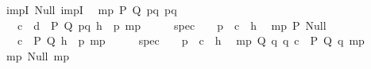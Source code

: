 \begin{isabellebody}
\isanewline
\ \ impI{\isacharcolon}{\kern0pt}\ {\isachardoublequoteopen}Null{\isachardoublequoteclose}\ {\isachardoublequoteopen}impI{\isachardoublequoteclose}\isanewline
\isanewline
\ \ mp\ {\isacharparenleft}{\kern0pt}P{\isacharcomma}{\kern0pt}\ Q{\isacharparenright}{\kern0pt}{\isacharcolon}{\kern0pt}\ {\isachardoublequoteopen}{\isasymlambda}pq{\isachardot}{\kern0pt}\ pq{\isachardoublequoteclose}\isanewline
\ \ \ \ {\isachardoublequoteopen}\isactrlbold {\isasymlambda}{\isacharparenleft}{\kern0pt}c{\isacharcolon}{\kern0pt}\ {\isacharunderscore}{\kern0pt}{\isacharparenright}{\kern0pt}\ {\isacharparenleft}{\kern0pt}d{\isacharcolon}{\kern0pt}\ {\isacharunderscore}{\kern0pt}{\isacharparenright}{\kern0pt}\ P\ Q\ pq\ {\isacharparenleft}{\kern0pt}h{\isacharcolon}{\kern0pt}\ {\isacharunderscore}{\kern0pt}{\isacharparenright}{\kern0pt}\ p{\isachardot}{\kern0pt}\ mp\ {\isasymcdot}\ {\isacharunderscore}{\kern0pt}\ {\isasymcdot}\ {\isacharunderscore}{\kern0pt}\ {\isasymbullet}\ {\isacharparenleft}{\kern0pt}spec\ {\isasymcdot}\ {\isacharunderscore}{\kern0pt}\ {\isasymcdot}\ p\ {\isasymbullet}\ c\ {\isasymbullet}\ h{\isacharparenright}{\kern0pt}{\isachardoublequoteclose}\isanewline
\isanewline
\ \ mp\ {\isacharparenleft}{\kern0pt}P{\isacharparenright}{\kern0pt}{\isacharcolon}{\kern0pt}\ {\isachardoublequoteopen}Null{\isachardoublequoteclose}\isanewline
\ \ \ \ {\isachardoublequoteopen}\isactrlbold {\isasymlambda}{\isacharparenleft}{\kern0pt}c{\isacharcolon}{\kern0pt}\ {\isacharunderscore}{\kern0pt}{\isacharparenright}{\kern0pt}\ P\ Q\ {\isacharparenleft}{\kern0pt}h{\isacharcolon}{\kern0pt}\ {\isacharunderscore}{\kern0pt}{\isacharparenright}{\kern0pt}\ p{\isachardot}{\kern0pt}\ mp\ {\isasymcdot}\ {\isacharunderscore}{\kern0pt}\ {\isasymcdot}\ {\isacharunderscore}{\kern0pt}\ {\isasymbullet}\ {\isacharparenleft}{\kern0pt}spec\ {\isasymcdot}\ {\isacharunderscore}{\kern0pt}\ {\isasymcdot}\ p\ {\isasymbullet}\ c\ {\isasymbullet}\ h{\isacharparenright}{\kern0pt}{\isachardoublequoteclose}\isanewline
\isanewline
\ \ mp\ {\isacharparenleft}{\kern0pt}Q{\isacharparenright}{\kern0pt}{\isacharcolon}{\kern0pt}\ {\isachardoublequoteopen}{\isasymlambda}q{\isachardot}{\kern0pt}\ q{\isachardoublequoteclose}\ {\isachardoublequoteopen}\isactrlbold {\isasymlambda}{\isacharparenleft}{\kern0pt}c{\isacharcolon}{\kern0pt}\ {\isacharunderscore}{\kern0pt}{\isacharparenright}{\kern0pt}\ P\ Q\ q{\isachardot}{\kern0pt}\ mp\ {\isasymcdot}\ {\isacharunderscore}{\kern0pt}\ {\isasymcdot}\ {\isacharunderscore}{\kern0pt}{\isachardoublequoteclose}\isanewline
\isanewline
\ \ mp{\isacharcolon}{\kern0pt}\ {\isachardoublequoteopen}Null{\isachardoublequoteclose}\ {\isachardoublequoteopen}mp{\isachardoublequoteclose}\isanewline

\end{isabellebody}
